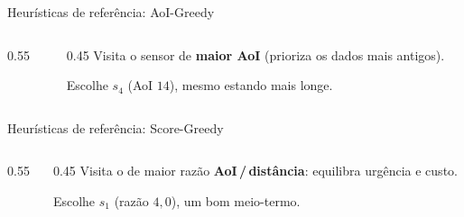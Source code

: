 \documentclass[aspectratio=169,11pt]{beamer}
\newcommand{\heurgraph}{%
  \node[hbase] (b) at (0,0) {$b$};
  \node[hsensor] (s1) at (1.7,1.3) {$s_1$};
  \node[hsensor] (s2) at (3.4,0.8) {$s_2$};
  \node[hsensor] (s3) at (1.3,-1.5) {$s_3$};
  \node[hsensor] (s4) at (3.8,-1.3) {$s_4$};
  \draw[gray!55] (b)--(s1) (b)--(s2) (b)--(s3) (b)--(s4);
}
\begin{document}
\begin{frame}{Heurísticas de referência: AoI-Greedy}
  \begin{columns}[c]
    \begin{column}{0.55\textwidth}
      \centering
    \end{column}
    \begin{column}{0.45\textwidth}
      \small
      Visita o sensor de \textbf{maior AoI} (prioriza os dados mais antigos).

      \vspace{0.6em}
      Escolhe $s_4$ (AoI $14$), mesmo estando mais longe.
    \end{column}
  \end{columns}
\end{frame}

\begin{frame}{Heurísticas de referência: Score-Greedy}
  \begin{columns}[c]
    \begin{column}{0.55\textwidth}
      \centering
    \end{column}
    \begin{column}{0.45\textwidth}
      \small
      Visita o de maior razão \textbf{AoI\,/\,distância}: equilibra urgência e custo.

      \vspace{0.6em}
      Escolhe $s_1$ (razão $4{,}0$), um bom meio-termo.
    \end{column}
  \end{columns}
\end{frame}
\end{document}
